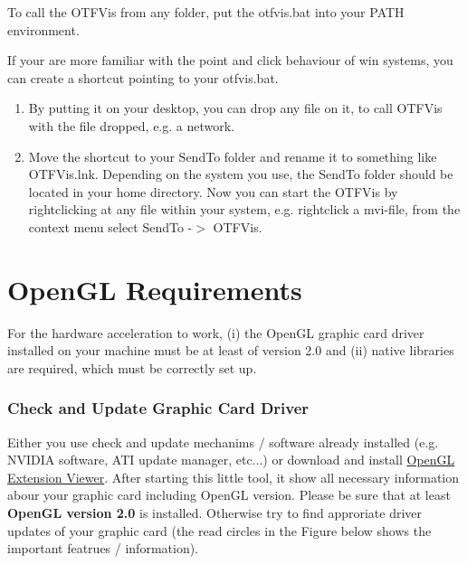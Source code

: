 To call the OTFVis from any folder, put the otfvis.bat into your PATH environment.

If your are more familiar with the point and click behaviour of win  systems, you can create a shortcut pointing to your otfvis.bat.
\begin{enumerate}

	\item By putting it on your desktop, you can drop any file on it, to call OTFVis with the file dropped, e.g. a network.

	\item 
Move  the shortcut to your SendTo folder and rename it to something like  OTFVis.lnk. Depending on the system you use, the SendTo folder should be  located in your home directory. Now you can start the OTFVis by  rightclicking at any file within your system, e.g. rightclick a  mvi-file, from the context menu select SendTo -$>$ OTFVis.


\end{enumerate}



\vfill\eject
\section{OpenGL Requirements}

For  the hardware acceleration to work, (i) the OpenGL graphic card driver  installed on your machine must be at least of version 2.0 and (ii)  native libraries are required, which must be correctly set up.

\subsubsection{Check and Update Graphic Card Driver}

Either you use check and update mechanims / software already  installed (e.g. NVIDIA software, ATI update manager, etc...) or download  and install \href{http://www.realtech-vr.com/glview}{OpenGL Extension Viewer}.  After starting this little tool, it show all necessary information  abour your graphic card including OpenGL version. Please be sure that at  least \textbf{OpenGL version 2.0} is installed. Otherwise try  to find approriate driver updates of your graphic card (the read circles  in the Figure below shows the important featrues / information).


